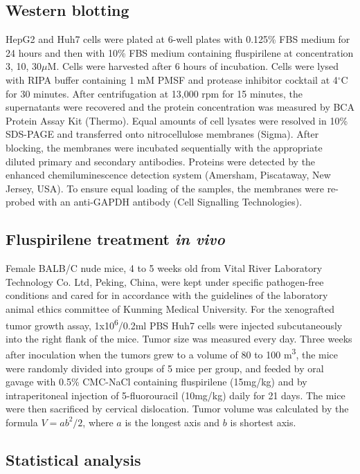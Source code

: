 \documentclass[10pt]{article}
\begin{document}
\subsection*{Western blotting}

HepG2 and Huh7 cells were plated at 6-well plates with 0.125\% FBS medium for 24 hours and then with 10\% FBS medium containing fluspirilene at concentration 3, 10, 30$\mu$M. Cells were harvested after 6 hours of incubation. Cells were lysed with RIPA buffer containing 1 mM PMSF and protease inhibitor cocktail at 4$^\circ$C for 30 minutes. After centrifugation at 13,000 rpm for 15 minutes, the supernatants were recovered and the protein concentration was measured by BCA Protein Assay Kit (Thermo). Equal amounts of cell lysates were resolved in 10\% SDS-PAGE and transferred onto nitrocellulose membranes (Sigma). After blocking, the membranes were incubated sequentially with the appropriate diluted primary and secondary antibodies. Proteins were detected by the enhanced chemiluminescence detection system (Amersham, Piscataway, New Jersey, USA). To ensure equal loading of the samples, the membranes were re-probed with an anti-GAPDH antibody (Cell Signalling Technologies).

\subsection*{Fluspirilene treatment \textit{in vivo}}

Female BALB/C nude mice, 4 to 5 weeks old from Vital River Laboratory Technology Co. Ltd, Peking, China, were kept under specific pathogen-free conditions and cared for in accordance with the guidelines of the laboratory animal ethics committee of Kunming Medical University. For the xenografted tumor growth assay, 1x10\textsuperscript{6}/0.2ml PBS Huh7 cells were injected subcutaneously into the right flank of the mice. Tumor size was measured every day. Three weeks after inoculation when the tumors grew to a volume of 80 to 100 m\textsuperscript{3}, the mice were randomly divided into groups of 5 mice per group, and feeded by oral gavage with 0.5\% CMC-NaCl containing fluspirilene (15mg/kg) and by intraperitoneal injection of 5-fluorouracil (10mg/kg) daily for 21 days. The mice were then sacrificed by cervical dislocation. Tumor volume was calculated by the formula $V=ab^2/2$, where $a$ is the longest axis and $b$ is shortest axis.

\subsection*{Statistical analysis}
\end{document}
